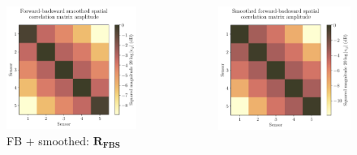 \documentclass[UKenglish,8pt,aspectratio=1610]{beamer}
\begin{document}
\begin{frame}
	\begin{columns}
		\begin{column}{0.33\textwidth}
			\vspace{-15pt}
			\begin{figure}[h!]
				\centering
				\includegraphics[scale=0.3]{question8/matrices/forward_backward_smoothed_spatial_correlation_matrix_amplitude}
				\caption{FB + smoothed: $\mathbf{R_{FBS}}$}
			\end{figure}
		\end{column}
		\begin{column}{0.33\textwidth}
			\vspace{-15pt}
			\begin{figure}[h!]
				\centering
				\includegraphics[scale=0.3]{question8/matrices/smoothed_forward_backward_spatial_correlation_matrix_amplitude}

\end{figure}
\end{column}
\end{columns}
\end{frame}
\end{document}
